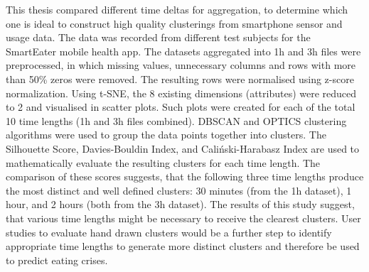
This thesis compared different time deltas for aggregation, to determine which one is ideal to construct high quality clusterings from smartphone sensor and usage data. The data was recorded from different test subjects for the SmartEater mobile health app. The datasets aggregated into 1h and 3h files were preprocessed, in which missing values, unnecessary columns and rows with more than 50\% zeros were removed. The resulting rows were normalised using z-score normalization. Using t-SNE, the 8 existing dimensions (attributes) were reduced to 2 and visualised in scatter plots. Such plots were created for each of the total 10 time lengths (1h and 3h files combined). DBSCAN and OPTICS clustering algorithms were used to group the data points together into clusters. The Silhouette Score, Davies-Bouldin Index, and Caliński-Harabasz Index are used to mathematically evaluate the resulting clusters for each time length. The comparison of these scores suggests, that the following three time lengths produce the most distinct and well defined clusters:
30 minutes (from the 1h dataset), 1 hour, and 2 hours (both from the 3h dataset). The results of this study suggest, that various time lengths might be necessary to receive the clearest clusters. User studies to evaluate hand drawn clusters would be a further step to identify appropriate time lengths to generate more distinct clusters and therefore be used to predict eating crises.
